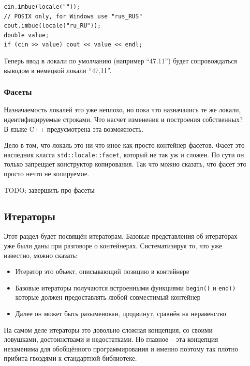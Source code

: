 \documentclass[a4paper,12pt,oneside]{article}
\begin{document}
\begin{lstlisting}
cin.imbue(locale(""));
// POSIX only, for Windows use "rus_RUS"
cout.imbue(locale("ru_RU")); 
double value;
if (cin >> value) cout << value << endl;
\end{lstlisting}

Теперь ввод в локали по умолчанию (например ``47.11'') будет сопровождаться выводом в немецкой локали ``47,11''.

\subsubsection{Фасеты}\label{subsubsec:facets}

Назначаемость локалей это уже неплохо, но пока что назначались те же локали, идентифицируемые строками. Что насчет изменения и построения собственных? В языке C++ предусмотрена эта возможность.

Дело в том, что локаль это ни что иное как просто контейнер фасетов. Фасет это наследник класса \lstinline!std::locale::facet!, который не так уж и сложен. По сути он только запрещает конструктор копирования. Так что можно сказать, что фасет это просто нечто не копируемое.

TODO: завершить про фасеты

\pagebreak
\subsection{Итераторы}\label{Iterators}

Этот раздел будет посвящён итераторам. Базовые представления об итераторах уже были даны при разговоре о контейнерах. Систематизируя то, что уже известно, можно сказать:

\begin{itemize}
\item Итератор это объект, описывающий позицию в контейнере
\item Базовые итераторы получаются встроенными функциями \lstinline!begin()! и \lstinline!end()! которые должен предоставлять любой совместимый контейнер 
\item Далее он может быть разыменован, продвинут, сравнён на неравенство
\end{itemize}

На самом деле итераторы это довольно сложная концепция, со своими ловушками, достоинствами и недостатками. Но главное -- эта концепция незаменима для обобщённого программирования и именно поэтому так плотно прибита гвоздями к стандартной библиотеке.
\end{document}
